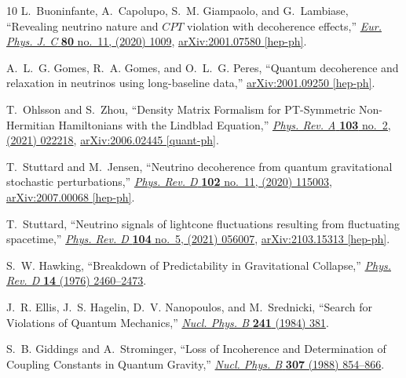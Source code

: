 \documentclass[aps, prd, onecolumn, tightenlines, notitlepage, superscriptaddress, nofootinbib, preprintnumbers, floatfix,showkeys,11pt]{revtex4-2}
\begin{document}
\begin{thebibliography}{10}
L.~Buoninfante, A.~Capolupo, S.~M. Giampaolo, and G.~Lambiase, ``{Revealing
  neutrino nature and $CPT$ violation with decoherence effects},''
  \href{http://dx.doi.org/10.1140/epjc/s10052-020-08549-9}{{\em Eur. Phys. J.
  C} {\bfseries 80} no.~11, (2020) 1009},
  \href{http://arxiv.org/abs/2001.07580}{{\ttfamily arXiv:2001.07580
  [hep-ph]}}.

A.~L.~G. Gomes, R.~A. Gomes, and O.~L.~G. Peres, ``{Quantum decoherence and
  relaxation in neutrinos using long-baseline data},''
  \href{http://arxiv.org/abs/2001.09250}{{\ttfamily arXiv:2001.09250
  [hep-ph]}}.

T.~Ohlsson and S.~Zhou, ``{Density Matrix Formalism for PT-Symmetric
  Non-Hermitian Hamiltonians with the Lindblad Equation},''
  \href{http://dx.doi.org/10.1103/PhysRevA.103.022218}{{\em Phys. Rev. A}
  {\bfseries 103} no.~2, (2021) 022218},
  \href{http://arxiv.org/abs/2006.02445}{{\ttfamily arXiv:2006.02445
  [quant-ph]}}.

T.~Stuttard and M.~Jensen, ``{Neutrino decoherence from quantum gravitational
  stochastic perturbations},''
  \href{http://dx.doi.org/10.1103/PhysRevD.102.115003}{{\em Phys. Rev. D}
  {\bfseries 102} no.~11, (2020) 115003},
  \href{http://arxiv.org/abs/2007.00068}{{\ttfamily arXiv:2007.00068
  [hep-ph]}}.

T.~Stuttard, ``{Neutrino signals of lightcone fluctuations resulting from
  fluctuating spacetime},''
  \href{http://dx.doi.org/10.1103/PhysRevD.104.056007}{{\em Phys. Rev. D}
  {\bfseries 104} no.~5, (2021) 056007},
  \href{http://arxiv.org/abs/2103.15313}{{\ttfamily arXiv:2103.15313
  [hep-ph]}}.

S.~W. Hawking, ``{Breakdown of Predictability in Gravitational Collapse},''
  \href{http://dx.doi.org/10.1103/PhysRevD.14.2460}{{\em Phys. Rev. D}
  {\bfseries 14} (1976) 2460--2473}.

J.~R. Ellis, J.~S. Hagelin, D.~V. Nanopoulos, and M.~Srednicki, ``{Search for
  Violations of Quantum Mechanics},''
  \href{http://dx.doi.org/10.1016/0550-3213(84)90053-1}{{\em Nucl. Phys. B}
  {\bfseries 241} (1984) 381}.

S.~B. Giddings and A.~Strominger, ``{Loss of Incoherence and Determination of
  Coupling Constants in Quantum Gravity},''
  \href{http://dx.doi.org/10.1016/0550-3213(88)90109-5}{{\em Nucl. Phys. B}
  {\bfseries 307} (1988) 854--866}.


\end{thebibliography}
\end{document}
